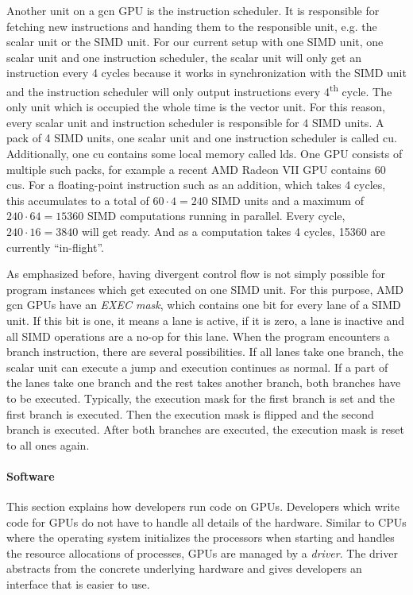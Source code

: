 Another unit on a \gls{gcn} GPU is the instruction scheduler. It is responsible for fetching new instructions and handing them to the responsible unit, e.g. the scalar unit or the SIMD unit. For our current setup with one SIMD unit, one scalar unit and one instruction scheduler, the scalar unit will only get an instruction every 4 cycles because it works in synchronization with the SIMD unit and the instruction scheduler will only output instructions every 4\textsuperscript{th} cycle. The only unit which is occupied the whole time is the vector unit. For this reason, every scalar unit and instruction scheduler is responsible for 4 SIMD units. A pack of 4 SIMD units, one scalar unit and one instruction scheduler is called \gls{cu}. Additionally, one \gls{cu} contains some local memory called \gls{lds}. One GPU consists of multiple such packs, for example a recent AMD Radeon VII GPU contains 60 \glspl{cu}. For a floating-point instruction such as an addition, which takes 4 cycles, this accumulates to a total of $60 \cdot 4 = 240$ SIMD units and a maximum of $240 \cdot 64 = 15360$ SIMD computations running in parallel. Every cycle, $240 \cdot 16 = 3840$ will get ready. And as a computation takes 4 cycles, 15360 are currently \enquote{in-flight}.

As emphasized before, having divergent control flow is not simply possible for program instances which get executed on one SIMD unit. For this purpose, AMD \gls{gcn} GPUs have an \emph{EXEC mask}, which contains one bit for every lane of a SIMD unit. If this bit is one, it means a lane is active, if it is zero, a lane is inactive and all SIMD operations are a no-op for this lane. When the program encounters a branch instruction, there are several possibilities. If all lanes take one branch, the scalar unit can execute a jump and execution continues as normal. If a part of the lanes take one branch and the rest takes another branch, both branches have to be executed. Typically, the execution mask for the first branch is set and the first branch is executed. Then the execution mask is flipped and the second branch is executed. After both branches are executed, the execution mask is reset to all ones again.

\paragraph{Software} This section explains how developers run code on GPUs. Developers which write code for GPUs do not have to handle all details of the hardware. Similar to CPUs where the operating system initializes the processors when starting and handles the resource allocations of processes, GPUs are managed by a \emph{driver}. The driver abstracts from the concrete underlying hardware and gives developers an interface that is easier to use.

